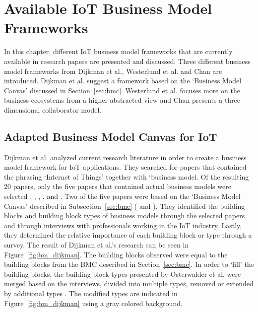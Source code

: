 \section{Available IoT Business Model Frameworks}
\label{sec:bmf_available}
\vspace{-1em}
	In this chapter, different IoT business model frameworks that are currently available in research papers are presented and discussed. Three different business model frameworks from Dijkman et al., Westerlund et al. and Chan are introduced. Dijkman et al. suggest a framework based on the `Business Model Canvas' discussed in Section~\ref{sec:bmc}. Westerlund et al. focuses more on the business ecosystems from a higher abstracted view and Chan presents a three dimensional collaborator model.
	\vspace{-1em}
	\subsection{Adapted Business Model Canvas for IoT}
	\vspace{-1em}
		Dijkman et al. \cite{dijkman} analyzed current research literature in order to create a business model framework for IoT applications. They searched for papers that contained the phrasing `Internet of Things' together with `business model. Of the resulting 20 papers, only the five papers that contained actual business models were selected \cite{bucherer}, \cite{fan}, \cite{lixu}, \cite{liu}, and \cite{sun}. Two of the five papers were based on the `Business Model Canvas' described in Subsection~\ref{sec:bmc} (\cite{bucherer} and \cite{sun}). They identified the building blocks and building block types of business models through the selected papers and through interviews with professionals working in the IoT industry. Lastly, they determined the relative importance of each building block or type through a survey. The result of Dijkman et al.'s research can be seen in Figure~\ref{fig:bm_dijkman}. The building blocks observed were equal to the building blocks from the BMC described in Section~\ref{sec:bmc}. In order to `fill' the building blocks, the building block types presented by Osterwalder et al. were merged based on the interviews, divided into multiple types, removed or extended by additional types \cite{osterwalder2010} \cite{dijkman}. The modified types are indicated in Figure~\ref{fig:bm_dijkman} using a gray colored background. 
